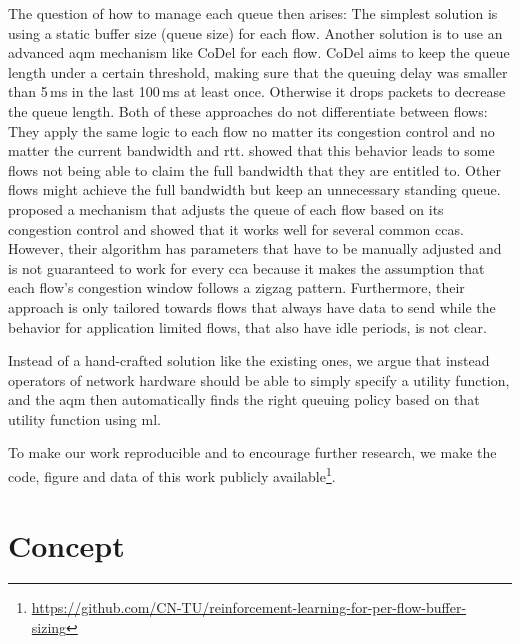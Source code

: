 \documentclass[conference]{IEEEtran}
\begin{document}
The question of how to manage each queue then arises: The simplest solution is using a static buffer size (queue size) for each flow. Another solution is to use an advanced \gls{aqm} mechanism like CoDel for each flow. CoDel aims to keep the queue length under a certain threshold, making sure that the queuing delay was smaller than 5\,ms in the last 100\,ms at least once. Otherwise it drops packets to decrease the queue length. Both of these approaches do not differentiate between flows: They apply the same logic to each flow no matter its congestion control and no matter the current bandwidth and \gls{rtt}. \cite{bachl_cocoa_2019} showed that this behavior leads to some flows not being able to claim the full bandwidth that they are entitled to. Other flows might achieve the full bandwidth but keep an unnecessary standing queue. \cite{bachl_rax_2019} proposed a mechanism that adjusts the queue of each flow based on its congestion control and showed that it works well for several common \glspl{cca}. However, their algorithm has parameters that have to be manually adjusted and is not guaranteed to work for every \gls{cca} because it makes the assumption that each flow's congestion window follows a zigzag pattern. Furthermore, their approach is only tailored towards flows that always have data to send while the behavior for application limited flows, that also have idle periods, is not clear. 

Instead of a hand-crafted solution like the existing ones, we argue that instead operators of network hardware should be able to simply specify a utility function, and the \gls{aqm} then automatically finds the right queuing policy based on that utility function using \gls{ml}. 

To make our work reproducible and to encourage further research, we make the code, figure and data of this work publicly available\footnote{\url{https://github.com/CN-TU/reinforcement-learning-for-per-flow-buffer-sizing}}. 

\section{Concept}
\end{document}
